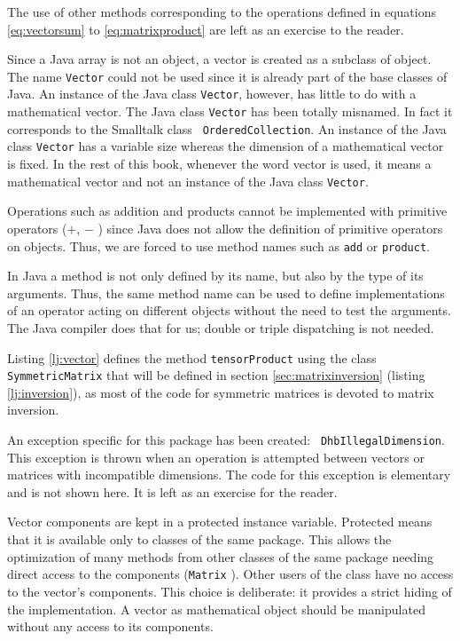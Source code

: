 \documentclass[twoside]{book}
\begin{document}
The use of other methods corresponding to the operations defined
in equations \ref{eq:vectorsum} to \ref{eq:matrixproduct} are left
as an exercise to the reader.

Since a Java array is not an object, a vector is created as a
subclass of object. The name {\tt Vector} could not be used since
it is already part of the base classes of Java. An instance of the
Java class {\tt Vector}, however, has little to do with a
mathematical vector. The Java class {\tt Vector} has been totally
misnamed. In fact it corresponds to the Smalltalk class {\tt
OrderedCollection}. An instance of the Java class {\tt Vector} has
a variable size whereas the dimension of a mathematical vector is
fixed. In the rest of this book, whenever the word vector is used,
it means a mathematical vector and not an instance of the Java
class {\tt Vector}.

Operations such as addition and products cannot be implemented
with primitive operators ($+$, $-$ \eg) since Java does not allow
the definition of primitive operators on objects. Thus, we are
forced to use method names such as {\tt add} or {\tt product}.

In Java a method is not only defined by its name, but also by the
type of its arguments. Thus, the same method name can be used to
define implementations of an operator acting on different objects
without the need to test the arguments. The Java compiler does
that for us; double or triple dispatching is not needed.

Listing \ref{lj:vector} defines the method {\tt tensorProduct}
using the class {\tt SymmetricMatrix} that will be defined in
section \ref{sec:matrixinversion} (\cf listing
\ref{lj:inversion}), as most of the code for symmetric matrices is
devoted to matrix inversion.

An exception specific for this package has been created: {\tt
DhbIllegalDimension}. This exception is thrown when an operation
is attempted between vectors or matrices with incompatible
dimensions. The code for this exception is elementary and is not
shown here. It is left as an exercise for the reader.

Vector components are kept in a protected instance variable.
Protected means that it is available only to classes of the same
package. This allows the optimization of many methods from other
classes of the same package needing direct access to the
components ({\tt Matrix} \eg). Other users of the class have no
access to the vector's components. This choice is deliberate: it
provides a strict hiding of the implementation. A vector as
mathematical object should be manipulated without any access to
its components.
\end{document}
